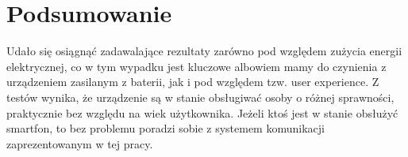 \chapter{Podsumowanie}
Udało się osiągnąć zadawalające rezultaty zarówno pod względem zużycia energii elektrycznej, co w tym wypadku jest kluczowe albowiem mamy do czynienia z urządzeniem zasilanym z baterii, jak i pod względem tzw. user experience.
Z testów wynika, że urządzenie są w stanie obsługiwać osoby o różnej sprawności, praktycznie bez względu na wiek użytkownika. Jeżeli ktoś jest w stanie obsłużyć smartfon, to bez problemu poradzi sobie z systemem komunikacji zaprezentowanym w tej pracy.
